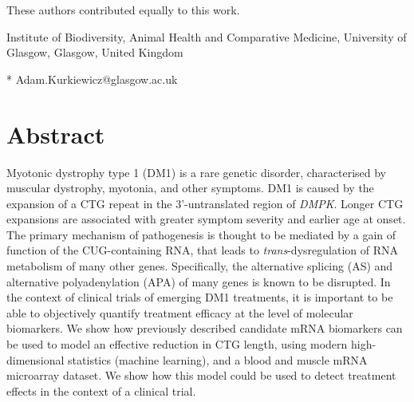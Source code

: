 \documentclass[10pt,letterpaper]{article}
\begin{document}
\begin{flushleft}
% 
%
\Yinyang These authors contributed equally to this work.


\textcurrency Institute of Biodiversity, Animal Health and Comparative Medicine, University of Glasgow, Glasgow, United Kingdom %



* Adam.Kurkiewicz@glasgow.ac.uk

\end{flushleft}
\section*{Abstract}

Myotonic dystrophy type 1 (DM1) is a rare genetic disorder, characterised by muscular dystrophy, myotonia, and other symptoms. DM1 is caused by the expansion of a CTG repeat in the 3'-untranslated region of {\it DMPK}. Longer CTG expansions are associated with greater symptom severity and earlier age at onset. The primary mechanism of pathogenesis is thought to be mediated by a gain of function of the CUG-containing RNA, that leads to {\it trans}-dysregulation of RNA metabolism of many other genes. Specifically, the alternative splicing (AS) and alternative polyadenylation (APA) of many genes is known to be disrupted. In the context of clinical trials of emerging DM1 treatments, it is important to be able to objectively quantify treatment efficacy at the level of molecular biomarkers. We show how previously described candidate mRNA biomarkers can be used to model an effective reduction in CTG length, using modern high-dimensional statistics (machine learning), and a blood and muscle mRNA microarray dataset. We show how this model could be used to detect treatment effects in the context of a clinical trial.
\end{document}
